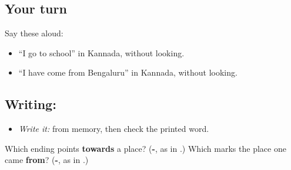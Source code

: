 \subsection*{Your turn}
Say these aloud:

\begin{itemize}
\raggedright
  \item “I go to school” in Kannada, without looking.
  \item “I have come from Bengaluru” in Kannada, without looking.
\end{itemize}

\subsection*{Writing: }
\begin{itemize}
\raggedright
  \item \emph{Write it:} \textbf{} from memory, then check the printed word.
\end{itemize}

\begin{tcolorbox}[breakable,colback=teal!4,colframe=teal!35!black,title={Before you move on}]
Which ending points \textbf{towards} a place? (\textbf{-}, as in \textbf{}.) Which marks the place one came \textbf{from}? (\textbf{-}, as in \textbf{}.)
\end{tcolorbox}
